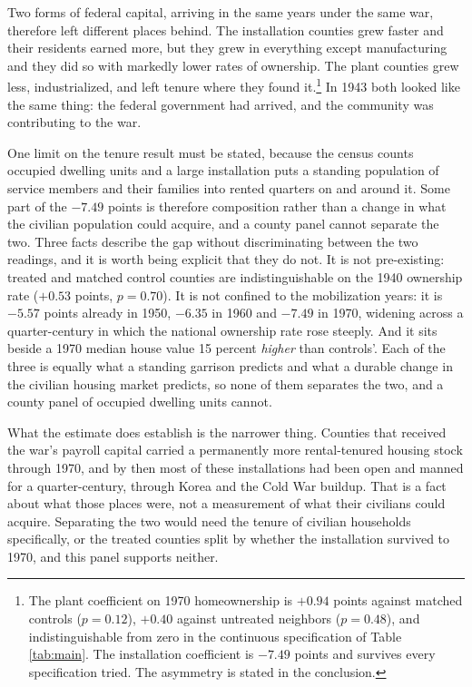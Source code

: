\documentclass[12pt]{article}
\begin{document}
Two forms of federal capital, arriving in the same years under the same war,
therefore left different places behind. The installation counties grew faster
and their residents earned more, but they grew in everything except
manufacturing and they did so with markedly lower rates of ownership. The plant
counties grew less, industrialized, and left tenure where they found it.\footnote{The plant
coefficient on 1970 homeownership is $+0.94$ points against matched controls
($p = 0.12$), $+0.40$ against untreated neighbors ($p = 0.48$), and
indistinguishable from zero in the continuous specification of
Table \ref{tab:main}. The installation coefficient is $-7.49$ points and
survives every specification tried. The asymmetry is stated in the conclusion.}
In 1943 both looked like the same thing: the federal
government had arrived, and the community was contributing to the war.

One limit on the tenure result must be stated, because the census counts
occupied dwelling units and a large installation puts a standing population of
service members and their families into rented quarters on and around it. Some
part of the $-7.49$ points is therefore composition rather than a change in what
the civilian population could acquire, and a county panel cannot separate the
two. Three facts describe the gap without discriminating between the two readings,
and it is worth being explicit that they do not. It is not pre-existing: treated
and matched control counties are indistinguishable on the 1940 ownership rate
($+0.53$ points, $p = 0.70$). It is not confined to the mobilization years: it is
$-5.57$ points already in 1950, $-6.35$ in 1960 and $-7.49$ in 1970, widening
across a quarter-century in which the national ownership rate rose steeply. And
it sits beside a 1970 median house value 15 percent \emph{higher} than
controls'. Each of the three is equally what a standing garrison predicts and
what a durable change in the civilian housing market predicts, so none of them
separates the two, and a county panel of occupied dwelling units cannot.

What the estimate does establish is the narrower thing. Counties that received
the war's payroll capital carried a permanently more rental-tenured housing stock
through 1970, and by then most of these installations had been open and manned
for a quarter-century, through Korea and the Cold War buildup. That is a fact
about what those places were, not a measurement of what their civilians could
acquire. Separating the two would need the tenure of civilian households
specifically, or the treated counties split by whether the installation survived
to 1970, and this panel supports neither.
\end{document}
